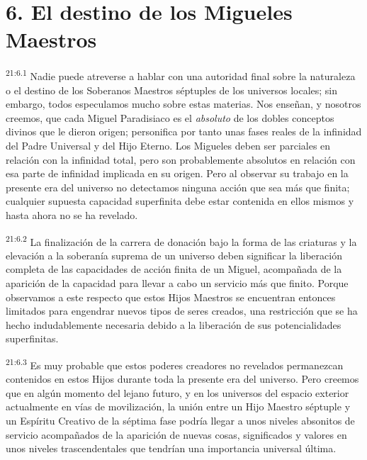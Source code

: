 \section*{6. El destino de los Migueles Maestros}
\par
\textsuperscript{21:6.1} Nadie puede atreverse a hablar con una autoridad final sobre la naturaleza o el destino de los Soberanos Maestros séptuples de los universos locales; sin embargo, todos especulamos mucho sobre estas materias. Nos enseñan, y nosotros creemos, que cada Miguel Paradisiaco es el \textit{absoluto} de los dobles conceptos divinos que le dieron origen; personifica por tanto unas fases reales de la infinidad del Padre Universal y del Hijo Eterno. Los Migueles deben ser parciales en relación con la infinidad total, pero son probablemente absolutos en relación con esa parte de infinidad implicada en su origen. Pero al observar su trabajo en la presente era del universo no detectamos ninguna acción que sea más que finita; cualquier supuesta capacidad superfinita debe estar contenida en ellos mismos y hasta ahora no se ha revelado.

\par
\textsuperscript{21:6.2} La finalización de la carrera de donación bajo la forma de las criaturas y la elevación a la soberanía suprema de un universo deben significar la liberación completa de las capacidades de acción finita de un Miguel, acompañada de la aparición de la capacidad para llevar a cabo un servicio más que finito. Porque observamos a este respecto que estos Hijos Maestros se encuentran entonces limitados para engendrar nuevos tipos de seres creados, una restricción que se ha hecho indudablemente necesaria debido a la liberación de sus potencialidades superfinitas.

\par
\textsuperscript{21:6.3} Es muy probable que estos poderes creadores no revelados permanezcan contenidos en estos Hijos durante toda la presente era del universo. Pero creemos que en algún momento del lejano futuro, y en los universos del espacio exterior actualmente en vías de movilización, la unión entre un Hijo Maestro séptuple y un Espíritu Creativo de la séptima fase podría llegar a unos niveles absonitos de servicio acompañados de la aparición de nuevas cosas, significados y valores en unos niveles trascendentales que tendrían una importancia universal última.

